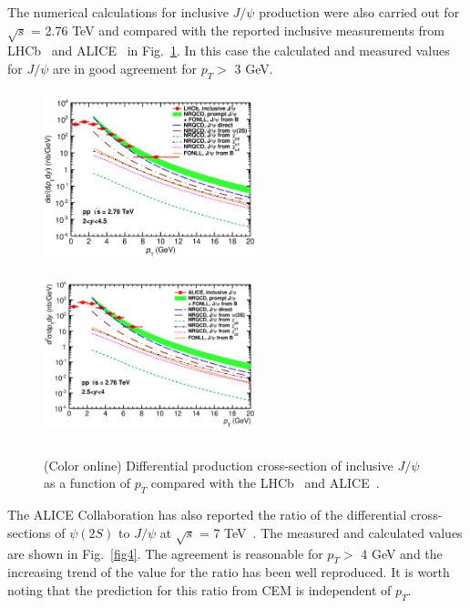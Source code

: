 \documentclass{iopart}
\begin{document}
The numerical calculations for inclusive $J/\psi$ production were also carried out for $\sqrt{s}$ = 2.76 TeV and compared with the reported inclusive measurements from LHCb~\cite{jhep041} and ALICE~\cite{plb718} in Fig.~\ref{fig3}. In this case the calculated and measured values for $J/\psi$ are in good agreement for $p_T >$ 3 GeV.

\begin{figure}[t]
\begin{center}
\includegraphics[width=6.15cm,height=5.0cm,angle=0]{Inclusive_JPSI_LHCb_2760GeV.eps}~~~~ \includegraphics[width=6.15cm,height=5.0cm,angle=0]{2.76TeV_Inclusive_Jpsi_ALICE_all.eps}
\end{center}
\caption{(Color online) Differential production cross-section of inclusive $J/\psi$ as a function of $p_{T}$ compared with the 
LHCb~\cite{jhep041} and ALICE~\cite{epjc}.}
\label{fig3}
\end{figure}



The ALICE Collaboration has also reported the ratio of the differential cross-sections of $\psi(2S)$ to $J/\psi$ at $\sqrt{s}$ = 7 TeV~\cite{epjc}. 
The measured and calculated values are shown in Fig.~\ref{fig4}. The agreement is reasonable for $p_{T} >$ 4 GeV and the increasing trend of the value for the ratio has been well reproduced. It is worth noting that the prediction for this ratio from CEM is independent of $p_T$. 
\end{document}
